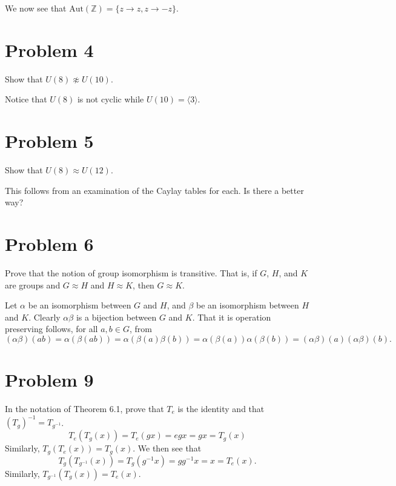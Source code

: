 \documentclass[12pt]{article}
\newcommand{\Z}{\mathbb{Z}}
\newcommand{\aut}{\mbox{Aut}}
\begin{document}
We now see that $\aut(\Z)=\{z\to z,z\to -z\}$.

\section*{Problem 4}

Show that $U(8)\not\approx U(10)$.

Notice that $U(8)$ is not cyclic while $U(10)=\langle 3\rangle$.

\section*{Problem 5}

Show that $U(8)\approx U(12)$.

This follows from an examination of the Caylay tables for each.  Is there a better way?

\section*{Problem 6}

Prove that the notion of group isomorphism is transitive.  That is, if $G$,
$H$, and $K$ are groups and $G\approx H$ and $H\approx K$, then $G\approx K$.

Let $\alpha$ be an isomorphism between $G$ and $H$, and $\beta$ be an isomorphism
between $H$ and $K$.  Clearly $\alpha\beta$ is a bijection between $G$ and $K$.
That it is operation preserving follows, for all $a,b\in G$, from
\begin{equation*}
(\alpha\beta)(ab)=\alpha(\beta(ab))=\alpha(\beta(a)\beta(b))=\alpha(\beta(a))\alpha(\beta(b))=
(\alpha\beta)(a)(\alpha\beta)(b).
\end{equation*}

\section*{Problem 9}

In the notation of Theorem 6.1, prove that $T_e$ is the identity and that $(T_g)^{-1}=T_{g^{-1}}$.
\begin{equation*}
T_e(T_g(x))=T_e(gx)=egx=gx=T_g(x)
\end{equation*}
Similarly, $T_g(T_e(x))=T_g(x)$.  We then see that
\begin{equation*}
T_g(T_{g^{-1}}(x))=T_g(g^{-1}x)=gg^{-1}x=x=T_e(x).
\end{equation*}
Similarly, $T_{g^{-1}}(T_g(x))=T_e(x)$.
\end{document}
